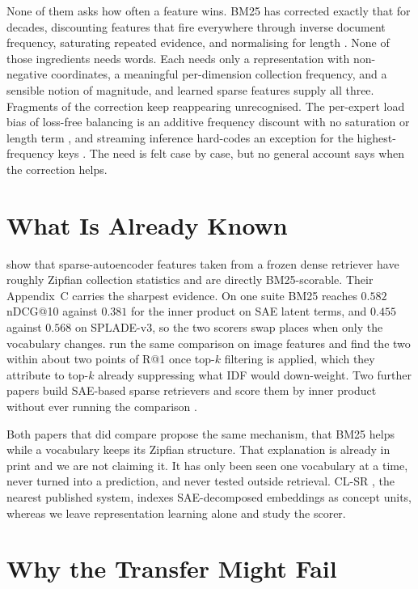 \documentclass[11pt]{article}
\begin{document}
None of them asks how often a feature wins. BM25 has corrected exactly that for
decades, discounting features that fire everywhere through inverse document
frequency, saturating repeated evidence, and normalising for length
\citep{robertson2009bm25}. None of those ingredients needs words. Each needs
only a representation with non-negative coordinates, a meaningful per-dimension
collection frequency, and a sensible notion of magnitude, and learned sparse
features supply all three.
Fragments of the correction keep reappearing unrecognised. The per-expert load
bias of loss-free balancing is an additive frequency discount with no saturation
or length term \citep{wang2024lossfree}, and streaming inference hard-codes an
exception for the highest-frequency keys \citep{xiao2024streamingllm}. The need
is felt case by case, but no general account says when the correction helps.

\section{What Is Already Known}

\citet{clavie2026latent} show that sparse-autoencoder features taken from a
frozen dense retriever have roughly Zipfian collection statistics and are
directly BM25-scorable. Their Appendix~C carries the sharpest evidence. On one
suite BM25 reaches $0.582$ nDCG@10 against $0.381$ for the inner product on SAE
latent terms, and $0.455$ against $0.568$ on SPLADE-v3, so the two scorers swap
places when only the vocabulary changes. \citet{han2026bm25v} run the same
comparison on image features and find the two within about two points of R@1
once top-$k$ filtering is applied, which they attribute to top-$k$ already
suppressing what IDF would down-weight. Two further papers build
SAE-based sparse retrievers and score them by inner product without ever running
the comparison \citep{formal2026splare,zong2026tokens}.

Both papers that did compare propose the same mechanism, that BM25 helps while a
vocabulary keeps its Zipfian structure. That explanation is already in print and
we are not claiming it. It has only been seen one vocabulary at a time, never
turned into a prediction, and never tested outside retrieval. CL-SR
\citep{park2025clsr}, the nearest published system, indexes SAE-decomposed
embeddings as concept units, whereas we leave representation learning alone and
study the scorer.

\section{Why the Transfer Might Fail}
\end{document}
